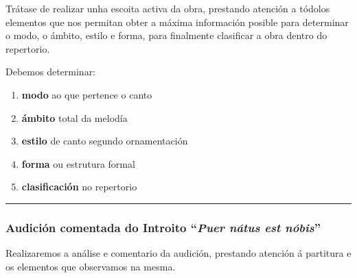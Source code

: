 \documentclass[spanish, a4paper,nobind]{templates/ociamthesis}
\providecommand{\tightlist}{%
  \setlength{\itemsep}{0pt}\setlength{\parskip}{0pt}}
\begin{document}
Trátase de realizar unha escoita activa da obra, prestando atención a tódolos elementos que nos permitan obter a máxima información posible para determinar o modo, o ámbito, estilo e forma, para finalmente clasificar a obra dentro do repertorio.

Debemos determinar:

\begin{enumerate}
\def\labelenumi{\arabic{enumi}.}
\tightlist
\item
  \textbf{modo} ao que pertence o canto
\item
  \textbf{ámbito} total da melodía
\item
  \textbf{estilo} de canto segundo ornamentación
\item
  \textbf{forma} ou estrutura formal
\item
  \textbf{clasificación} no repertorio
\end{enumerate}

\begin{center}\rule{0.5\linewidth}{0.5pt}\end{center}

\newpage

\hypertarget{audiciuxf3n-comentada-do-introito-puer-nuxe1tus-est-nuxf3bis}{%
\subsubsection*{\texorpdfstring{Audición comentada do Introito ``\emph{Puer nátus est nóbis}''}{Audición comentada do Introito ``Puer nátus est nóbis''}}\label{audiciuxf3n-comentada-do-introito-puer-nuxe1tus-est-nuxf3bis}}

\vspace*{0.25cm}

Realizaremos a análise e comentario da audición, prestando atención á partitura e os elementos que observamos na mesma.

\par
\vspace*{0.35cm}
\end{document}
